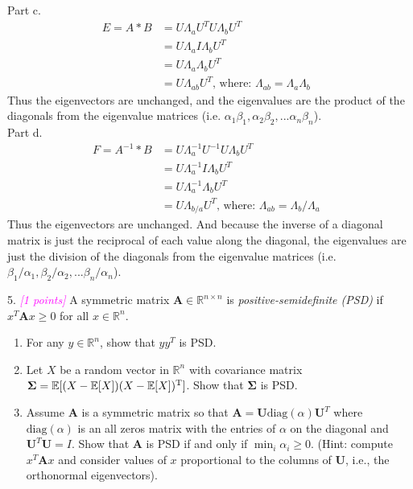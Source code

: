 \documentclass{article}
\newcommand{\field}[1]{\mathbb{#1}}
\newcommand{\1}{\mathbf{1}}
\newcommand{\R}{\field{R}} %
\newcommand{\T}{^{\textrm T}} %
\def\diag{\text{diag}}
\newcommand{\mat}[1]{\boldsymbol{#1}} %
\newcommand{\ProbOpr}[1]{\mathbb{#1}}
\newcommand{\grade}[1]{\small\textcolor{magenta}{\emph{[#1 points]}} \normalsize}
\begin{document}
Part c.
\begin{align}
    E = A*B & =  U\Lambda_aU^TU\Lambda_bU^T \\
    & =  U\Lambda_aI\Lambda_bU^T \\
    & =  U\Lambda_a\Lambda_bU^T \\
    & =  U\Lambda_{ab}U^T \text{, where: $\Lambda_{ab} = \Lambda_{a}  \Lambda_{b} $ }
\end{align}
Thus the eigenvectors are unchanged, and the eigenvalues are the product of the diagonals from the eigenvalue matrices (i.e. $\alpha_1 \beta_1,\alpha_2 \beta_2, ... \alpha_n \beta_n $).\\

Part d.
\begin{align}
    F = A^{-1}*B & =  U\Lambda_a^{-1}U^{-1}  U\Lambda_bU^T \\
    & =  U\Lambda_a^{-1} I\Lambda_bU^T \\
    & =  U\Lambda_a^{-1} \Lambda_bU^T \\
    & =  U\Lambda_{b/a}U^T \text{, where: $\Lambda_{ab} = \Lambda_{b} / \Lambda_{a} $ }
\end{align}
Thus the eigenvectors are unchanged. And because the inverse of a diagonal matrix is just the reciprocal of each value along the diagonal, the eigenvalues are just the division of the diagonals from the eigenvalue matrices (i.e. $\beta_1/\alpha_1 , \beta_2/\alpha_2, ...  \beta_n/\alpha_n $).\\



\newpage






{\color{blue}

5. \grade{1} A symmetric matrix $\mat{A} \in \R^{n \times n}$ is \emph{positive-semidefinite (PSD)} if $x^T \mat{A} x \geq 0$ for all $x \in \R^n$. 
\begin{enumerate} 
	\item For any $y \in \R^n$, show that $y y^T$ is PSD. 
	\item Let $X$ be a random vector in $\R^n$ with covariance matrix $\mat{\Sigma} =
\ProbOpr{E}[(X-\ProbOpr{E}[X])(X-\ProbOpr{E}[X])\T]$. Show that $\mat{\Sigma}$ is PSD. 
	\item Assume $\mat{A}$ is a symmetric matrix so that $\mat{A} = \mat{U} \diag(\alpha) \mat{U}^T$ where $\diag({\alpha})$ is an all zeros matrix with the entries of ${\alpha}$ on the diagonal and $\mat{U}^T \mat{U} = I$. Show that $\mat{A}$ is PSD if and only if $\min_i \alpha_i \geq 0$. (Hint: compute $x^T \mat{A} x$ and consider values of $x$ proportional to the columns of $\mat{U}$, i.e., the orthonormal eigenvectors).
\end{enumerate}
}
\end{document}
